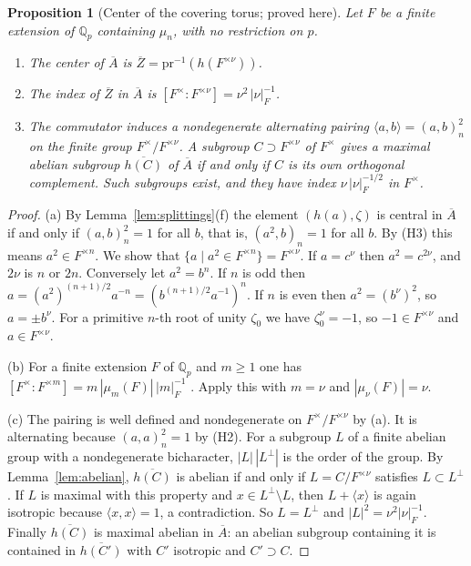 \documentclass[12pt,letterpaper]{article}
\numberwithin{equation}{section}
\newtheorem{xproposition}[theorem]{Proposition}
\theoremstyle{definition}
\newcommand{\proved}{proved here}
\newcommand{\Q}{\mathbb Q}
\newcommand{\bA}{\overline{A}}
\newcommand{\bZ}{\overline{Z}}
\newcommand{\pr}{\mathrm{pr}}
\begin{document}
\begin{xproposition}[Center of the covering torus; \proved]\label{prop:center}
Let $F$ be a finite extension of $\Q_p$ containing $\mu_n$, with no restriction on $p$.
\begin{enumerate}[label=(\alph*),leftmargin=*,itemsep=1pt]
\item The center of $\bA$ is $\bZ=\pr^{-1}(h(F^{\times\nu}))$.
\item The index of $\bZ$ in $\bA$ is $[F^\times:F^{\times\nu}]=\nu^2\,|\nu|_F^{-1}$.
\item The commutator induces a nondegenerate alternating pairing
$\langle a,b\rangle=(a,b)_n^2$ on the finite group $F^\times/F^{\times\nu}$.  A subgroup
$C\supset F^{\times\nu}$ of $F^\times$ gives a maximal abelian subgroup $\overline{h(C)}$ of
$\bA$ if and only if $C$ is its own orthogonal complement.  Such subgroups exist, and they
have index $\nu\,|\nu|_F^{-1/2}$ in $F^\times$.
\end{enumerate}
\end{xproposition}
\begin{proof}
(a) By Lemma~\ref{lem:splittings}(f) the element $(h(a),\zeta)$ is central in $\bA$ if and
only if $(a,b)_n^2=1$ for all $b$, that is, $(a^2,b)_n=1$ for all $b$.  By (H3) this means
$a^2\in F^{\times n}$.  We show that $\{a\mid a^2\in F^{\times n}\}=F^{\times\nu}$.  If
$a=c^\nu$ then $a^2=c^{2\nu}$, and $2\nu$ is $n$ or $2n$.  Conversely let $a^2=b^n$.  If
$n$ is odd then $a=(a^2)^{(n+1)/2}a^{-n}=(b^{(n+1)/2}a^{-1})^n$.  If $n$ is even then
$a^2=(b^{\nu})^2$, so $a=\pm b^\nu$.  For a primitive $n$-th root of unity $\zeta_0$ we
have $\zeta_0^\nu=-1$, so $-1\in F^{\times\nu}$ and $a\in F^{\times\nu}$.

(b) For a finite extension $F$ of $\Q_p$ and $m\ge1$ one has
$[F^\times:F^{\times m}]=m\,|\mu_m(F)|\,|m|_F^{-1}$ \cite[Ch.~II, Cor.~5.8]{Ne99}.  Apply
this with $m=\nu$ and $|\mu_\nu(F)|=\nu$.

(c) The pairing is well defined and nondegenerate on $F^\times/F^{\times\nu}$ by (a).  It
is alternating because $(a,a)_n^2=1$ by (H2).  For a subgroup $L$ of a finite abelian
group with a nondegenerate bicharacter, $|L|\,|L^\perp|$ is the order of the group.  By
Lemma~\ref{lem:abelian}, $\overline{h(C)}$ is abelian if and only if $L=C/F^{\times\nu}$
satisfies $L\subset L^\perp$.  If $L$ is maximal with this property and
$x\in L^\perp\setminus L$, then $L+\langle x\rangle$ is again isotropic because
$\langle x,x\rangle=1$, a contradiction.  So $L=L^\perp$ and $|L|^2=\nu^2|\nu|_F^{-1}$.
Finally $\overline{h(C)}$ is maximal abelian in $\bA$: an abelian subgroup containing it is
contained in $\overline{h(C')}$ with $C'$ isotropic and $C'\supset C$.
\end{proof}
\end{document}
